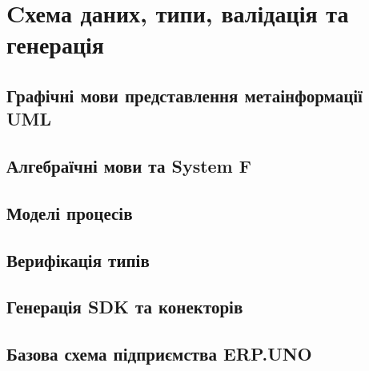 \chapter{Cхема даних, типи, валідація та генерація}

\section{Графічні мови представлення метаінформації UML}

\section{Алгебраїчні мови та System F}

\section{Моделі процесів}

\section{Верифікація типів}

\section{Генерація SDK та конекторів}

\section{Базова схема підприємства ERP.UNO}

